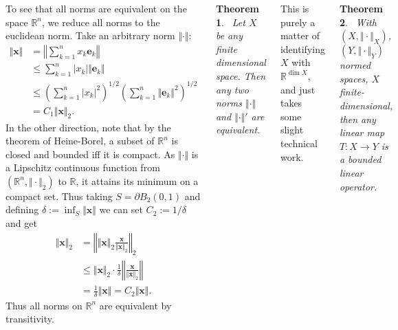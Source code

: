 \documentclass{tikzposter} %
\newtheorem{theorem}{Theorem}
\begin{document}
\begin{columns}
{    To see that all norms are equivalent on the space $\mathbb{R}^{n}$, we reduce all norms to the euclidean norm. Take an arbitrary norm $\Vert \cdot \Vert$:
    \begin{align*}
      \Vert \bm{x} \Vert &= \left\Vert \sum_{k=1}^{n} x_{k} \bm{e}_{k} \right\Vert \\
                         &\le \sum_{k=1}^{n} |x_{k}| \Vert \bm{e}_{k} \Vert \\
                         &\le \left(\sum_{k=1}^{n} |x_{k}|^{2} \right)^{1/2} \left(\sum_{k=1}^{n} \Vert \bm{e}_{k} \Vert^{2}\right)^{1/2} \\
      &= C_{1}\Vert \bm{x} \Vert_{2}.
    \end{align*}
    In the other direction, note that by the theorem of Heine-Borel, a subset of $\mathbb{R}^{n}$ is closed and bounded iff it is compact. As $\Vert \cdot \Vert$ is a Lipschitz continuous function from $(\mathbb{R}^{n}, \Vert \cdot \Vert_{2})$ to $\mathbb{R}$, it attains its minimum on a compact set. Thus taking $S = \partial B_{2}(0,1)$ and defining $\delta := \inf_{S} \Vert \bm{x} \Vert$ we can set $C_{2} := 1/\delta$ and get
    \begin{align*}
      \Vert \bm{x} \Vert_{2} &= \left\Vert \Vert \bm{x} \Vert_{2} \frac{\bm{x}}{\Vert \bm{x} \Vert_{2}} \right\Vert_{2} \\
                             &\le \Vert \bm{x} \Vert_{2} \cdot \frac{1}{\delta} \left\Vert \frac{\bm{x}}{\Vert \bm{x} \Vert_{2}} \right\Vert \\
      &= \frac{1}{\delta} \Vert \bm{x} \Vert = C_{2}\Vert \bm{x} \Vert.
    \end{align*}
    Thus all norms on $\mathbb{R}^{n}$ are equivalent by transitivity. \\

    \begin{theorem}
    \ Let $X$ be any finite dimensional space. Then any two norms $\Vert \cdot \Vert$ and $\Vert \cdot \Vert'$ are equivalent.
    \end{theorem}
    \hphantom{}

    This is purely a matter of identifying $X$ with $\mathbb{R}^{\dim X}$, and just takes some slight technical work. \\

    \begin{theorem}
    \ With $(X, \Vert \cdot \Vert_{X})$, $(Y, \Vert \cdot \Vert_{Y})$ normed spaces, $X$ finite-dimensional, then any linear map $T : X \to Y$ is a bounded linear operator.
    \end{theorem}
    \hphantom{}

}
\end{columns}
\end{document}
